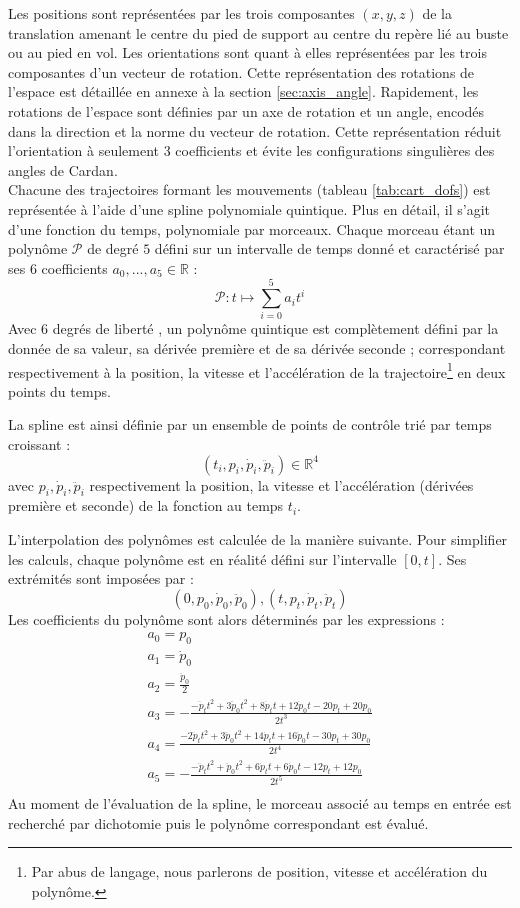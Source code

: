 Les positions sont représentées par les trois composantes $(x,y,z)$ de la translation
amenant le centre du pied de support au centre du repère lié au buste ou au pied en vol.
Les orientations sont quant à elles représentées par les trois composantes
d'un vecteur de rotation. Cette représentation des rotations de l'espace est 
détaillée en annexe à la section \ref{sec:axis_angle}.
Rapidement, les rotations de l'espace sont définies par un axe de rotation et un angle,
encodés dans la direction et la norme du vecteur de rotation.
Cette représentation réduit l'orientation à seulement $3$ coefficients et évite les 
configurations singulières des angles de Cardan.\\

Chacune des trajectoires formant les mouvements (tableau \ref{tab:cart_dofs})
est représentée à l'aide d'une spline polynomiale quintique.
Plus en détail, il s'agit d'une fonction du temps, polynomiale par morceaux.
Chaque morceau étant un polynôme $\mathcal{P}$ de degré $5$ défini
sur un intervalle de temps donné et caractérisé par ses $6$ 
coefficients $a_0,...,a_5 \in \mathbb{R}$ : 
$$
\mathcal{P} : t \longmapsto \sum_{i=0}^{5} a_it^i
$$
Avec $6$ \og degrés de liberté \fg, un polynôme quintique
est complètement défini par la donnée de sa valeur, sa dérivée première 
et de sa dérivée seconde ; correspondant respectivement à la position, 
la vitesse et l'accélération de la trajectoire\footnote{Par abus de langage, 
nous parlerons de position, vitesse et accélération du polynôme.}
en deux points du temps.

La spline est ainsi définie par un ensemble de points de contrôle 
trié par temps croissant :
$$
\left(
t_i, p_i, \dot{p}_i, \ddot{p}_i
\right)
\in \mathbb{R}^4
$$
avec $p_i, \dot{p}_i, \ddot{p}_i$ respectivement la position, la vitesse
et l'accélération (dérivées première et seconde) de la fonction au temps $t_i$.

L'interpolation des polynômes est calculée de la manière suivante.
Pour simplifier les calculs, chaque polynôme est en réalité défini
sur l'intervalle $[0,t]$.
Ses extrémités sont imposées par :
$$
(0,p_0,\dot{p}_0, \ddot{p}_0),(t, p_t,\dot{p}_t, \ddot{p}_t)
$$
Les coefficients du polynôme sont alors déterminés par les expressions :
\begin{gather*}
a_0 = p_{0} \\
a_1 = \dot{p}_{0} \\
a_2 = \frac{\ddot{p}_{0}}{2} \\
a_3 = -\frac{-\ddot{p}_{t}t^2+3\ddot{p}_{0}t^2+8\dot{p}_{t}t+12\dot{p}_{0}t-20p_{t}+20p_{0}}{2t^3} \\
a_4 = \frac{-2\ddot{p}_{t}t^2+3\ddot{p}_{0}t^2+14\dot{p}_{t}t+16\dot{p}_{0}t-30p_{t}+30p_{0}}{2t^4} \\
a_5 = -\frac{-\ddot{p}_{t}t^2+\ddot{p}_{0}t^2+6\dot{p}_{t}t+6\dot{p}_{0}t-12p_{t}+12p_{0}}{2t^5} \\
\end{gather*}
Au moment de l'évaluation de la spline, le morceau 
associé au temps en entrée est recherché par dichotomie 
puis le polynôme correspondant est évalué.\\

